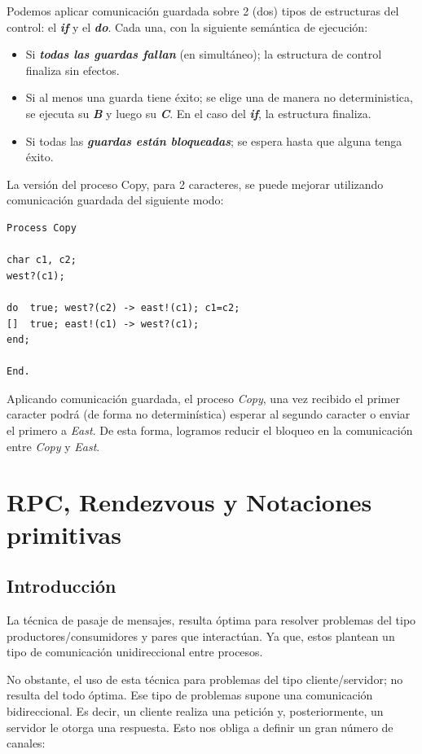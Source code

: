 \documentclass[a4paper, 10pt]{report}
\begin{document}
Podemos aplicar comunicación guardada sobre 2 (dos) tipos de estructuras del control: el \textbf{\emph{if}} y el \textbf{\emph{do}}. Cada una, con la siguiente semántica de ejecución:

\begin{itemize}
    \item Si \textbf{\emph{todas las guardas fallan}} (en simultáneo); la estructura de control finaliza sin efectos.
    \item Si al menos una guarda tiene éxito; se elige una de manera no deterministica, se ejecuta su \textbf{\emph{B}} y luego su \textbf{\emph{C}}. En el caso del \textbf{\emph{if}}, la estructura finaliza.
    \item Si todas las \textbf{\emph{guardas están bloqueadas}}; se espera hasta que alguna tenga éxito.
\end{itemize}

La versión del proceso Copy, para 2 caracteres, se puede mejorar utilizando comunicación guardada del siguiente modo:

\begin{lstlisting}
Process Copy

char c1, c2;
west?(c1);

do  true; west?(c2) -> east!(c1); c1=c2;
[]  true; east!(c1) -> west?(c1);
end;

End.
\end{lstlisting}

Aplicando comunicación guardada, el proceso \emph{Copy}, una vez recibido el primer caracter podrá (de forma no determinística) esperar al segundo caracter o enviar el primero a \emph{East}.
De esta forma, logramos reducir el bloqueo en la comunicación entre \emph{Copy} y \emph{East}.

\chapter{RPC, Rendezvous y Notaciones primitivas}

\section{Introducción}

La técnica de pasaje de mensajes, resulta óptima para resolver problemas del tipo productores/consumidores y pares que interactúan. Ya que, estos plantean un tipo de comunicación unidireccional entre procesos.

No obstante, el uso de esta técnica para problemas del tipo cliente/servidor; no resulta del todo óptima. Ese tipo de problemas supone una comunicación bidireccional. Es decir, un cliente realiza una petición y, posteriormente, un servidor le otorga una respuesta. Esto nos obliga a definir un gran número de canales:
\end{document}
